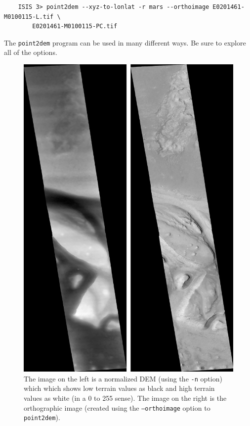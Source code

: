 \begin{verbatim}
    ISIS 3> point2dem --xyz-to-lonlat -r mars --orthoimage E0201461-M0100115-L.tif \
        E0201461-M0100115-PC.tif
\end{verbatim}

\noindent
The \texttt{point2dem} program can be used in many different ways.
Be sure to explore all of the options.

\begin{figure}
\begin{minipage}{5in}
\includegraphics[width=5in]{images/p19-norm_ortho.png}
\end{minipage}
\hfill
\begin{minipage}{1.5in}
\caption[P19 Normalized DEM and Orthophoto]{
    \label{p19-norm_ortho}
	The image on the left is a normalized DEM (using the
	\texttt{-n} option) which which shows low terrain values
	as black and high terrain values as white (in a 0 to 255
	sense).  The image on the right is the orthographic image
	(created using the \texttt{--orthoimage} option to
	\texttt{point2dem}).
    }
\end{minipage} \end{figure}

